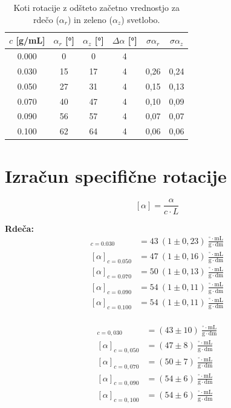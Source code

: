 \documentclass[a4paper,12pt]{article}
\begin{document}
\begin{table}[H]
\centering
\begin{tabular}{cccccc}
\toprule
$c$ [g/mL] & $\alpha_r$ [°] & $\alpha_z$ [°]  & $\Delta \alpha$ [°] & $\sigma \alpha_r$ & $\sigma \alpha_z$ \\
\midrule
0.000 & 0  & 0 & 4 &  \\
0.030 & 15 & 17 & 4 & 0,26 & 0,24 \\
0.050 & 27 & 31 & 4 & 0,15 & 0,13 \\
0.070 & 40 & 47 & 4 & 0,10 & 0,09 \\
0.090 & 56 & 57 & 4 & 0,07 & 0,07 \\
0.100 & 62 & 64 & 4 & 0,06 & 0,06 \\
\bottomrule
\end{tabular}
\caption{Koti rotacije z odšteto začetno vrednostjo za rdečo ($\alpha_r$) in zeleno ($\alpha_z$) svetlobo.}
\end{table}


\section*{Izračun specifične rotacije}
\[
[\alpha] = \frac{\alpha}{c \cdot L}
\]
\begin{minipage}{0.48\textwidth}
\textbf{Rdeča:}
\begin{align*}
[\alpha]_{c=0.030} &= 43 \ (1 \pm 0,23) \ \frac{^\circ \cdot \mathrm{mL}}{\mathrm{g} \cdot \mathrm{dm}}\\
[\alpha]_{c=0.050} &= 47 \ (1 \pm 0,16) \ \frac{^\circ \cdot \mathrm{mL}}{\mathrm{g} \cdot \mathrm{dm}}\\
[\alpha]_{c=0.070} &= 50 \ (1 \pm 0,13) \ \frac{^\circ \cdot \mathrm{mL}}{\mathrm{g} \cdot \mathrm{dm}}\\
[\alpha]_{c=0.090} &= 54 \ (1 \pm 0,11) \ \frac{^\circ \cdot \mathrm{mL}}{\mathrm{g} \cdot \mathrm{dm}}\\
[\alpha]_{c=0.100} &= 54 \ (1 \pm 0,11) \ \frac{^\circ \cdot \mathrm{mL}}{\mathrm{g} \cdot \mathrm{dm}}\\
\end{align*}
\end{minipage}
\hfill
\begin{minipage}{0.48\textwidth}

\begin{align*}
[\alpha]_{c=0,030} &= (43 \pm 10) \ \frac{^\circ \cdot \mathrm{mL}}{\mathrm{g} \cdot \mathrm{dm}} \\
[\alpha]_{c=0,050} &= (47 \pm 8) \ \frac{^\circ \cdot \mathrm{mL}}{\mathrm{g} \cdot \mathrm{dm}} \\
[\alpha]_{c=0,070} &= (50 \pm 7)  \ \frac{^\circ \cdot \mathrm{mL}}{\mathrm{g} \cdot \mathrm{dm}}\\
[\alpha]_{c=0,090} &= (54 \pm 6 )  \ \frac{^\circ \cdot \mathrm{mL}}{\mathrm{g} \cdot \mathrm{dm}}\\
[\alpha]_{c=0,100} &= (54 \pm 6 )  \ \frac{^\circ \cdot \mathrm{mL}}{\mathrm{g} \cdot \mathrm{dm}}\\
\end{align*}
\end{minipage}
\end{document}

